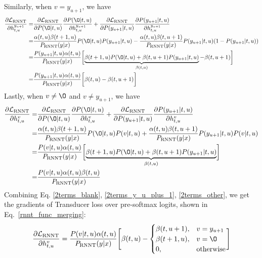 \documentclass{article}
\begin{document}
Similarly, when $v = y_{u+1}$, we have
\begin{equation}
\label{2terms_y_u_plus_1}
\begin{aligned}
\frac{\partial{\mathcal{L}_\text{RNNT}}}{\partial{h_{t, u}^{y_{u+1}}}}  = & \frac{\partial{\mathcal{L}_\text{RNNT}}}{\partial{P(\O| t, u)}} \frac{\partial{P(\O| t, u)}}{\partial{h_{t, u}^{y_{u+1}}}} + \frac{\partial{\mathcal{L}_\text{RNNT}}}{\partial{P(y_{u+1}| t, u)}} \frac{\partial{P(y_{u+1}| t, u)}}{\partial{h_{t, u}^{y_{u+1}}}} \\
 = & \frac{\alpha(t, u)\beta{(t+1,u)}}{P_\text{RNNT}(y|x)} P(\O| t, u)  P(y_{u+1}| t, u)  -\frac{\alpha(t, u)\beta{(t,u+1)}}{P_\text{RNNT}(y|x)} P(y_{u+1}| t, u)  (1 - P(y_{u+1}| t, u)) \\
= & \frac{P(y_{u+1}|t, u) \alpha(t,u) }{P_\text{RNNT}(y|x)} \biggl[\underbrace{\beta(t+1, u) P(\O|t,u)+ \beta(t, u+1) P(y_{u+1} | t, u)}_{\beta(t, u)} -\beta(t, u+1)   \biggr] \\
= & \frac{P(y_{u+1}|t, u) \alpha(t,u) }{P_\text{RNNT}(y|x)} \biggl[\beta(t, u)-\beta(t, u+1)  \biggr] 
\end{aligned}
\end{equation}
Lastly, when $v \neq \O$ and $v \neq y_{u+1}$, we have
\begin{equation}
\label{2terms_other}
\begin{aligned}
\frac{\partial{\mathcal{L}_\text{RNNT}}}{\partial{h_{t, u}^{v}}}  = & \frac{\partial{\mathcal{L}_\text{RNNT}}}{\partial{P(\O| t, u)}} \frac{\partial{P(\O| t, u)}}{\partial{h_{t, u}^{v}}} + \frac{\partial{\mathcal{L}_\text{RNNT}}}{\partial{P(y_{u+1}| t, u)}} \frac{\partial{P(y_{u+1}| t, u)}}{\partial{h_{t, u}^{v}}} \\
 = & \frac{\alpha(t, u)\beta{(t+1,u)}}{P_\text{RNNT}(y|x)} P(\O| t, u)  P(v| t, u)  +\frac{\alpha(t, u)\beta{(t,u+1)}}{P_\text{RNNT}(y|x)} P(y_{u+1}| t, u)   P(v| t, u) \\
= & \frac{P(v|t, u) \alpha(t,u) }{P_\text{RNNT}(y|x)} \biggl[\underbrace{\beta(t+1, u) P(\O|t,u)+ \beta(t, u+1) P(y_{u+1} | t, u)}_{\beta(t, u)}   \biggr] \\
= & \frac{P(v|t, u) \alpha(t,u) \beta(t, u) }{P_\text{RNNT}(y|x)}  
\end{aligned}
\end{equation}
Combining Eq. \ref{2terms_blank}, \ref{2terms_y_u_plus_1}, \ref{2terms_other}, we get the gradients of Transducer loss over pre-softmax logits, shown in Eq.~\ref{rnnt_func_merging}:
\begin{equation}
\label{rnnt_func_merging}
    \frac{\partial{\mathcal{L}_\text{RNNT}}}{\partial h^v_{t,u}} = \frac{P(v|t, u) \alpha(t, u)}{P_\text{RNNT}(y | x)}\Biggl[ \beta(t, u) - \begin{cases}
    \beta(t, u+1), &  v = y_{u + 1} \\
    \beta(t + 1, u), &  v = \O \\
    0, & \text{otherwise}
    \end{cases}
    \Biggr]
\end{equation}
\end{document}
